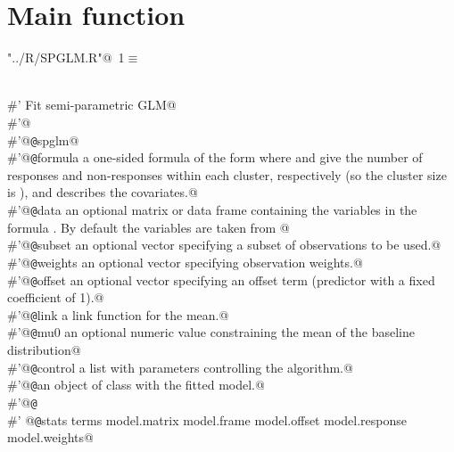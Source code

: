 \documentclass[reqno]{amsart}
\renewcommand{\NWtarget}[2]{\hypertarget{#1}{#2}}
\begin{document}
\section{Main function}

\begin{flushleft} \small\label{scrap1}\raggedright\small
\NWtarget{nuweb1}{} \verb@"../R/SPGLM.R"@\nobreak\ {\footnotesize {1}}$\equiv$
\vspace{-1ex}
\begin{list}{}{} \item
\mbox{}\verb@@\\
\mbox{}\verb@#' Fit semi-parametric GLM@\\
\mbox{}\verb@#'@\\
\mbox{}\verb@#'@{\tt @}\verb@rdname spglm@\\
\mbox{}\verb@#'@{\tt @}\verb@param formula a one-sided formula of the form  where  and  give the number of responses and non-responses within each cluster, respectively (so the cluster size is ), and  describes the covariates.@\\
\mbox{}\verb@#'@{\tt @}\verb@param data  an optional matrix or data frame containing the variables in the formula . By default the variables are taken from @\\
\mbox{}\verb@#'@{\tt @}\verb@param subset  an optional vector specifying a subset of observations to be used.@\\
\mbox{}\verb@#'@{\tt @}\verb@param weights an optional vector specifying observation weights.@\\
\mbox{}\verb@#'@{\tt @}\verb@param offset  an optional vector specifying an offset term (predictor with a fixed coefficient of 1).@\\
\mbox{}\verb@#'@{\tt @}\verb@param link      a link function for the mean.@\\
\mbox{}\verb@#'@{\tt @}\verb@param mu0       an optional numeric value constraining the mean of the baseline distribution@\\
\mbox{}\verb@#'@{\tt @}\verb@param control a list with parameters controlling the algorithm.@\\
\mbox{}\verb@#'@{\tt @}\verb@return an object of class  with the fitted model.@\\
\mbox{}\verb@#'@{\tt @}\verb@export@\\
\mbox{}\verb@#' @{\tt @}\verb@importFrom stats terms model.matrix model.frame model.offset model.response model.weights@\\

\end{list}
\end{flushleft}
\end{document}
